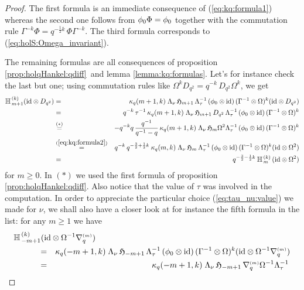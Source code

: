 \begin{proof}
The first formula is an immediate consequence of (\ref{eq:kq:formula1})
whereas the second one follows from $\phi_0 \Phi = \phi_0$
together with the commutation rule
$\Gamma^{-k}\Phi = q^{-\frac{1}{2}k}\,\Phi\Gamma^{-k}$.
The third formula corresponds to (\ref{eq:holS:Omega_invariant}).

The remaining formulas are all consequences of
proposition \ref{prop:holqHankel:qdiff}\ and lemma \ref{lemma:kq:formulas}\@.
Let's for instance check the last but one; using commutation rules like
$\Omega^k D_{q^2} = q^{-k}\, D_{q^2} \Omega^k$, we get
\begin{eqnarray*}
\mathbb{H}_{\,m+1}^{\,(k)} (\mbox{\rm id} \otimes D_{q^2})
&=&
\kappa_q(m+1,k) \; \Lambda_\nu \, \mathfrak{H}_{m+1} \, \Lambda_\tau^{-1}\,
         (\phi_0 \otimes \mbox{\rm id})\,(\Gamma^{-1} \otimes \Omega)^k (\mbox{\rm id} \otimes D_{q^2})
\\ &=&
q^{-k} \, \tau^{-1} \, \kappa_q(m+1,k) \; \Lambda_\nu \, \mathfrak{H}_{m+1} \,D_{q^2}\, \Lambda_\tau^{-1}\,
         (\phi_0 \otimes \mbox{\rm id})\,(\Gamma^{-1} \otimes \Omega)^k
\\ &\stackrel{(*)}{=}&
-q^{-k} q\, \frac{q^{-1}}{q^{-1}-q}\, \kappa_q(m+1,k)
     \; \Lambda_\nu \, \mathfrak{H}_{m} \Omega^2  \Lambda_\tau^{-1}\,
         (\phi_0 \otimes \mbox{\rm id})\,(\Gamma^{-1} \otimes \Omega)^k
\\ &\stackrel{(\ref{eq:kq:formula2})}{=}&
q^{-k}\,q^{-\frac{3}{2} +\frac{1}{2}k}\: \kappa_q(m,k)
     \; \Lambda_\nu \, \mathfrak{H}_{m} \, \Lambda_\tau^{-1}\,
         (\phi_0 \otimes \mbox{\rm id})\,(\Gamma^{-1} \otimes \Omega)^k  (\mbox{\rm id} \otimes \Omega^2)
\\ &=&
q^{-\frac{3}{2} - \frac{1}{2}k}\:  \mathbb{H}_{\,m}^{\,(k)}\, (\mbox{\rm id} \otimes \Omega^2)
\end{eqnarray*}
for $m\geq 0$.
In $(*)$ we used the first formula of proposition \ref{prop:holqHankel:qdiff}\@.
Also notice that the value of $\tau$ was involved in the computation.
In order to appreciate the particular choice (\ref{eq:tau_nu:value}) we made for $\nu$,
we shall also have a closer look at for instance the fifth formula in the list:
for any $m\geq 1$ we have
\begin{eqnarray*}
\lefteqn{ \YaH{-m+1}{k} (\id \tens \Omega^{-1} \nabq{m})} \\
&\hspace{3em}=&
         \kq(-m+1,k) \; \Lambda_\nu \, \holH{-m+1} \, \Lambda_\tau^{-1}\,
         (\evzero \tens \id)\,(\Gamma^{-1} \tens \Omega)^k
         (\id \tens \Omega^{-1} \nabq{m})   \\
&\hspace{3em}=& \kq(-m+1,k) \; \Lambda_\nu \, \holH{-m+1} \, \nabq{m} \Omega^{-1} \Lambda_\tau^{-1}\,

\end{eqnarray*}
\end{proof}
